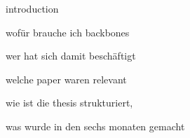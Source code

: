 introduction

wofür brauche ich backbones

wer hat sich damit beschäftigt

welche paper waren relevant

wie ist die thesis strukturiert, 

was wurde in den sechs monaten gemacht